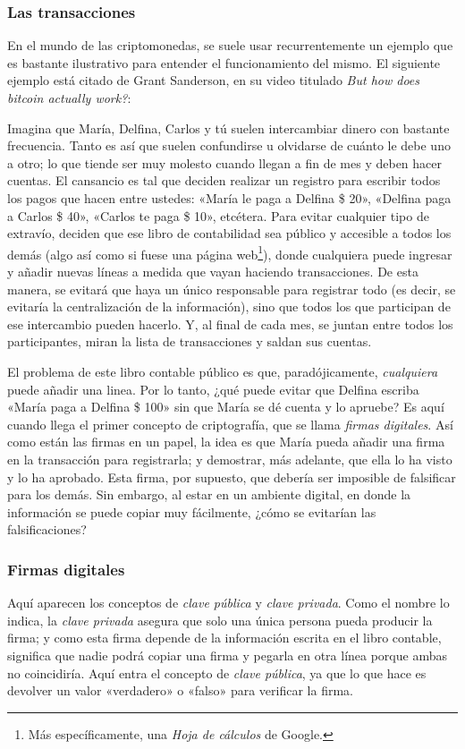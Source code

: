 \documentclass[12pt,a4paper,twoside]{book}
\begin{document}
\subsubsection{Las transacciones}
En el mundo de las criptomonedas, se suele usar recurrentemente un ejemplo que es bastante ilustrativo para entender el funcionamiento del mismo. El siguiente ejemplo está citado de Grant Sanderson, en su video titulado \textit{But how does bitcoin actually work?}:

Imagina que María, Delfina, Carlos y tú suelen intercambiar dinero con bastante frecuencia. Tanto es así que suelen confundirse u olvidarse de cuánto le debe uno a otro; lo que tiende ser muy molesto cuando llegan a fin de mes y deben hacer cuentas. El cansancio es tal que deciden realizar un registro para escribir todos los pagos que hacen entre ustedes: «María le paga a Delfina \$ 20», «Delfina paga a Carlos \$ 40», «Carlos te paga \$ 10», etcétera. Para evitar cualquier tipo de extravío, deciden que ese libro de contabilidad sea público y accesible a todos los demás (algo así como si fuese una página web\footnote{Más específicamente, una \textit{Hoja de cálculos} de Google.}), donde cualquiera puede ingresar y añadir nuevas líneas a medida que vayan haciendo transacciones. De esta manera, se evitará que haya un único responsable para registrar todo (es decir, se evitaría la centralización de la información), sino que todos los que participan de ese intercambio pueden hacerlo. Y, al final de cada mes, se juntan entre todos los participantes, miran la lista de transacciones y saldan sus cuentas.

El problema de este libro contable público es que, paradójicamente, \textit{cualquiera} puede añadir una linea. Por lo tanto, ¿qué puede evitar que Delfina escriba «María paga a Delfina \$ 100» sin que María se dé cuenta y lo apruebe? Es aquí cuando llega el primer concepto de criptografía, que se llama \textit{firmas digitales}. Así como están las firmas en un papel, la idea es que María pueda añadir una firma en la transacción para registrarla; y demostrar, más adelante, que ella lo ha visto y lo ha aprobado. Esta firma, por supuesto, que debería ser imposible de falsificar para los demás. Sin embargo, al estar en un ambiente digital, en donde la información se puede copiar muy fácilmente, ¿cómo se evitarían las falsificaciones?

\subsubsection{Firmas digitales}
Aquí aparecen los conceptos de \textit{clave pública} y \textit{clave privada}. Como el nombre lo indica, la \textit{clave privada} asegura que solo una única persona pueda producir la firma; y como esta firma depende de la información escrita en el libro contable, significa que nadie podrá copiar una firma y pegarla en otra línea porque ambas no coincidiría. Aquí entra el concepto de \textit{clave pública}, ya que lo que hace es devolver un valor «verdadero» o «falso» para verificar la firma.
\end{document}
